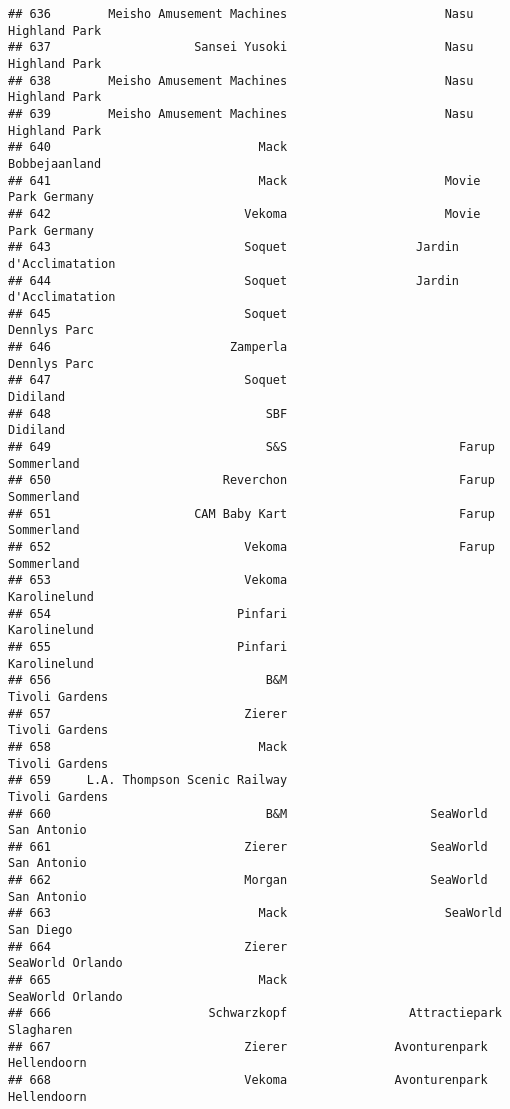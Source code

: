 \documentclass[
]{article}
\begin{document}
\begin{verbatim}
## 636        Meisho Amusement Machines                      Nasu Highland Park
## 637                    Sansei Yusoki                      Nasu Highland Park
## 638        Meisho Amusement Machines                      Nasu Highland Park
## 639        Meisho Amusement Machines                      Nasu Highland Park
## 640                             Mack                           Bobbejaanland
## 641                             Mack                      Movie Park Germany
## 642                           Vekoma                      Movie Park Germany
## 643                           Soquet                  Jardin d'Acclimatation
## 644                           Soquet                  Jardin d'Acclimatation
## 645                           Soquet                            Dennlys Parc
## 646                         Zamperla                            Dennlys Parc
## 647                           Soquet                                Didiland
## 648                              SBF                                Didiland
## 649                              S&S                        Farup Sommerland
## 650                        Reverchon                        Farup Sommerland
## 651                    CAM Baby Kart                        Farup Sommerland
## 652                           Vekoma                        Farup Sommerland
## 653                           Vekoma                            Karolinelund
## 654                          Pinfari                            Karolinelund
## 655                          Pinfari                            Karolinelund
## 656                              B&M                          Tivoli Gardens
## 657                           Zierer                          Tivoli Gardens
## 658                             Mack                          Tivoli Gardens
## 659     L.A. Thompson Scenic Railway                          Tivoli Gardens
## 660                              B&M                    SeaWorld San Antonio
## 661                           Zierer                    SeaWorld San Antonio
## 662                           Morgan                    SeaWorld San Antonio
## 663                             Mack                      SeaWorld San Diego
## 664                           Zierer                        SeaWorld Orlando
## 665                             Mack                        SeaWorld Orlando
## 666                      Schwarzkopf                 Attractiepark Slagharen
## 667                           Zierer               Avonturenpark Hellendoorn
## 668                           Vekoma               Avonturenpark Hellendoorn

\end{verbatim}
\end{document}

